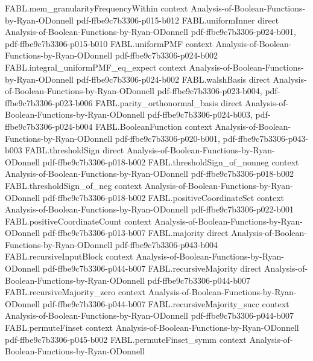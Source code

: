 \begin{theorem}
\proofstep
  {FABL.mem_granularityFrequencyWithin}
  {context}
  {Analysis-of-Boolean-Functions-by-Ryan-ODonnell}
  {pdf-ffbe9c7b3306-p015-b012}
\proofstep
  {FABL.uniformInner}
  {direct}
  {Analysis-of-Boolean-Functions-by-Ryan-ODonnell}
  {pdf-ffbe9c7b3306-p024-b001,
    pdf-ffbe9c7b3306-p015-b010}
\proofstep
  {FABL.uniformPMF}
  {context}
  {Analysis-of-Boolean-Functions-by-Ryan-ODonnell}
  {pdf-ffbe9c7b3306-p024-b002}
\proofstep
  {FABL.integral_uniformPMF_eq_expect}
  {context}
  {Analysis-of-Boolean-Functions-by-Ryan-ODonnell}
  {pdf-ffbe9c7b3306-p024-b002}
\proofstep
  {FABL.walshBasis}
  {direct}
  {Analysis-of-Boolean-Functions-by-Ryan-ODonnell}
  {pdf-ffbe9c7b3306-p023-b004,
    pdf-ffbe9c7b3306-p023-b006}
\proofstep
  {FABL.parity_orthonormal_basis}
  {direct}
  {Analysis-of-Boolean-Functions-by-Ryan-ODonnell}
  {pdf-ffbe9c7b3306-p024-b003,
    pdf-ffbe9c7b3306-p024-b004}
\proofstep
  {FABL.BooleanFunction}
  {context}
  {Analysis-of-Boolean-Functions-by-Ryan-ODonnell}
  {pdf-ffbe9c7b3306-p020-b001,
    pdf-ffbe9c7b3306-p043-b003}
\proofstep
  {FABL.thresholdSign}
  {direct}
  {Analysis-of-Boolean-Functions-by-Ryan-ODonnell}
  {pdf-ffbe9c7b3306-p018-b002}
\proofstep
  {FABL.thresholdSign_of_nonneg}
  {context}
  {Analysis-of-Boolean-Functions-by-Ryan-ODonnell}
  {pdf-ffbe9c7b3306-p018-b002}
\proofstep
  {FABL.thresholdSign_of_neg}
  {context}
  {Analysis-of-Boolean-Functions-by-Ryan-ODonnell}
  {pdf-ffbe9c7b3306-p018-b002}
\proofstep
  {FABL.positiveCoordinateSet}
  {context}
  {Analysis-of-Boolean-Functions-by-Ryan-ODonnell}
  {pdf-ffbe9c7b3306-p022-b001}
\proofstep
  {FABL.positiveCoordinateCount}
  {context}
  {Analysis-of-Boolean-Functions-by-Ryan-ODonnell}
  {pdf-ffbe9c7b3306-p013-b007}
\proofstep
  {FABL.majority}
  {direct}
  {Analysis-of-Boolean-Functions-by-Ryan-ODonnell}
  {pdf-ffbe9c7b3306-p043-b004}
\proofstep
  {FABL.recursiveInputBlock}
  {context}
  {Analysis-of-Boolean-Functions-by-Ryan-ODonnell}
  {pdf-ffbe9c7b3306-p044-b007}
\proofstep
  {FABL.recursiveMajority}
  {direct}
  {Analysis-of-Boolean-Functions-by-Ryan-ODonnell}
  {pdf-ffbe9c7b3306-p044-b007}
\proofstep
  {FABL.recursiveMajority_zero}
  {context}
  {Analysis-of-Boolean-Functions-by-Ryan-ODonnell}
  {pdf-ffbe9c7b3306-p044-b007}
\proofstep
  {FABL.recursiveMajority_succ}
  {context}
  {Analysis-of-Boolean-Functions-by-Ryan-ODonnell}
  {pdf-ffbe9c7b3306-p044-b007}
\proofstep
  {FABL.permuteFinset}
  {context}
  {Analysis-of-Boolean-Functions-by-Ryan-ODonnell}
  {pdf-ffbe9c7b3306-p045-b002}
\proofstep
  {FABL.permuteFinset_symm}
  {context}
  {Analysis-of-Boolean-Functions-by-Ryan-ODonnell}

\end{theorem}
